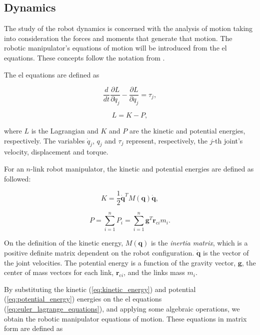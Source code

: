 \subsection{Dynamics}
\label{subsec:dynamics}

The study of the robot dynamics is concerned with the analysis of motion taking into consideration the forces and moments that generate that motion. The robotic manipulator's equations of motion will be introduced from the \gls{el} equations. These concepts follow the notation from \cite{Spong2005_robot_dynamics_control}.

The \gls{el} equations are defined as

\begin{equation}
    \label{eq:euler_lagrange_equations}
    \frac{d}{dt}\frac{\partial L}{\partial\dot{q}_j}-\frac{\partial L}{\partial q_j} = \tau_j ,
\end{equation}

\begin{equation}
    L = K - P,
\end{equation}

where $L$ is the Lagrangian and $K$ and $P$ are the kinetic and potential energies, respectively. The variables $\dot{q}_j$, $q_j$ and $\tau_j$ represent, respectively, the $j$-th joint's velocity, displacement and torque.

For an $n$-link robot manipulator, the kinetic and potential energies are defined as followed:

\begin{equation}
    \label{eq:kinetic_energy}
    K = \frac{1}{2}\dot{\boldsymbol{q}}^T M(\boldsymbol{q}) \dot{\boldsymbol{q}},
\end{equation}

\begin{equation}
    \label{eq:potential_energy}
    P = \sum^{n}_{i=1} P_i = \sum^{n}_{i=1} \boldsymbol{g}^T \boldsymbol{r}_{\text{c}i} m_i .
\end{equation}

On the definition of the kinetic energy, $M(\boldsymbol{q})$ is the \emph{inertia matrix}, which is a positive definite matrix dependent on the robot configuration. $\dot{\boldsymbol{q}}$ is the vector of the joint velocities.
The potential energy is a function of the gravity vector, $\boldsymbol{g}$, the center of mass vectors for each link, $\boldsymbol{r}_{\text{c}i}$, and the links mass $m_i$.

By substituting the kinetic (\ref{eq:kinetic_energy}) and potential (\ref{eq:potential_energy}) energies on the \gls{el} equations (\ref{eq:euler_lagrange_equations}), and applying some algebraic operations, we obtain the robotic manipulator equations of motion. These equations in matrix form are defined as

